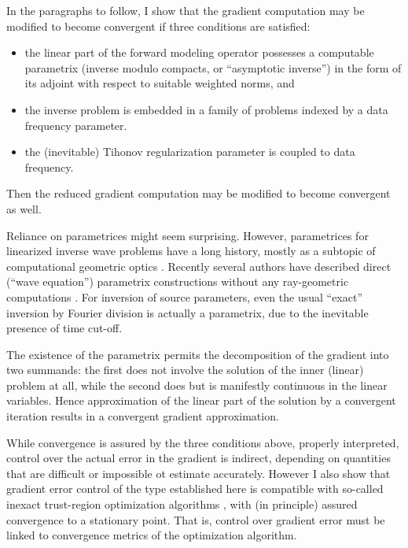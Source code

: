 In the paragraphs to follow, I show that the gradient computation may
be modified to become convergent if three conditions are satisfied:
\begin{itemize}
\item the linear part of the forward modeling operator possesses a
  computable parametrix (inverse modulo compacts, or ``asymptotic
  inverse'') in the form of its adjoint with respect to suitable
  weighted norms, and
\item the inverse problem is embedded in a family of problems indexed
  by a data frequency parameter.
\item the (inevitable) Tihonov regularization parameter is coupled to
  data frequency.
\end{itemize}
Then the reduced gradient 
computation may be modified to become convergent as well. 

Reliance on parametrices might seem surprising. However, parametrices
for linearized inverse wave problems have a long history, mostly as a
subtopic of computational geometric optics
\cite[]{CohBlei:77,Beyl:85,BeylBurr:90,VirJinMadLam:92,ArayaSymes:96,Operto:00}. Recently
several authors have described direct (``wave equation'') parametrix
constructions without any ray-geometric computations
\cite[]{ZhangBleistein:05,ZhangSunGray:07,XuZhangTang:11,tenKroode:12,HouSymes:15}. For
inversion of source parameters, even the usual ``exact'' inversion
by Fourier division is actually a parametrix, due to the inevitable
presence of time cut-off.

The existence of the parametrix permits the decomposition of the
gradient into two summands: the first does not involve the solution of
the inner (linear) problem at all, while the second does but is
manifestly continuous in the linear variables. Hence approximation of
the linear part of the solution by a convergent iteration results
in a convergent gradient approximation.

While convergence is assured by the three conditions above, properly
interpreted, control over the actual error in the gradient is
indirect, depending on quantities that are difficult or impossible ot
estimate accurately. However I also show that gradient error control
of the type established here is compatible with so-called inexact
trust-region optimization algorithms \cite[]{HeinkenVicente:01b}, with
(in principle) assured convergence to a stationary point. That is,
control over gradient error must be linked to convergence metrics of
the optimization algorithm.


